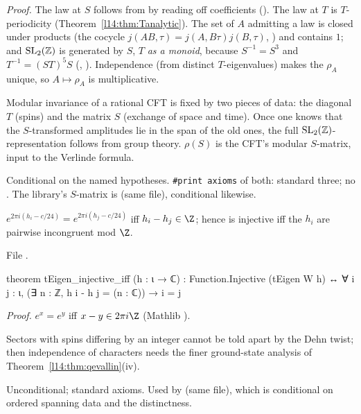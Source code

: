 \noindent\emph{Proof.} The law at $S$ follows from  by reading off coefficients ().
The law at $T$ is $T$-periodicity (Theorem~\ref{l14:thm:Tanalytic}). The set of $A$ admitting a law is closed under products
(the cocycle $j(AB,\tau) = j(A,B\tau)j(B,\tau)$, ) and contains $1$; and $\mathrm{SL}_2(\mathbb{Z})$ is generated by $S$, $T$
\emph{as a monoid}, because $S^{-1} = S^3$ and $T^{-1} = (ST)^5S$ (,
). Independence (from distinct $T$-eigenvalues) makes the $\rho_A$ unique, so $A\mapsto\rho_A$ is
multiplicative.
\begin{physics}
Modular invariance of a rational CFT is fixed by two pieces of data: the diagonal $T$ (spins) and the matrix $S$ (exchange of
space and time). Once one knows that the $S$-transformed amplitudes lie in the span of the old ones, the full
$\mathrm{SL}_2(\mathbb{Z})$-representation follows from group theory. $\rho(S)$ is the CFT's modular $S$-matrix, input to the Verlinde
formula.
\end{physics}
\begin{status}
Conditional on the named hypotheses. \texttt{\#print axioms} of both: standard three; no . The library's
$S$-matrix is  (same file), conditional likewise.
\end{status}

\begin{theorem}\label{l14:thm:teigen}
$e^{2\pi i(h_i-c/24)} = e^{2\pi i(h_j-c/24)}$ iff $h_i - h_j\in\Z$; hence  is injective iff the $h_i$ are pairwise
incongruent mod $\Z$.
\end{theorem}
\noindent File .
\begin{leancode}
theorem tEigen_injective_iff (h : ι → ℂ) :
    Function.Injective (tEigen W h) ↔ ∀ i j : ι, (∃ n : ℤ, h i - h j = (n : ℂ)) → i = j
\end{leancode}
\noindent\emph{Proof.} $e^x = e^y$ iff $x - y\in2\pi i\Z$ (Mathlib ).
\begin{physics}
Sectors with spins differing by an integer cannot be told apart by the Dehn twist; then independence of characters needs the
finer ground-state analysis of Theorem~\ref{l14:thm:qevallin}(iv).
\end{physics}
\begin{status}
Unconditional; standard axioms. Used by  (same file), which is conditional
on ordered spanning data and the distinctness.
\end{status}

